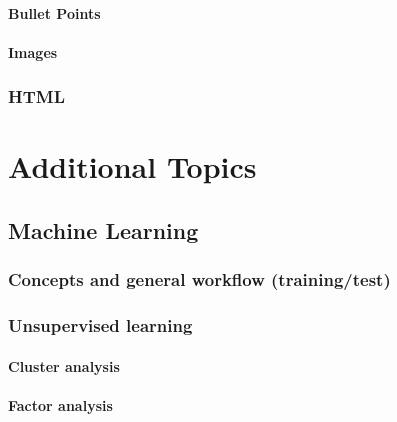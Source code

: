 \documentclass[
]{book}
\begin{document}
\hypertarget{bullet-points}{%
\subsection{Bullet Points}\label{bullet-points}}

\hypertarget{images}{%
\subsection{Images}\label{images}}

\hypertarget{html}{%
\section{HTML}\label{html}}

\hypertarget{part-additional-topics}{%
\part*{Additional Topics}\label{part-additional-topics}}

\hypertarget{machine_learning}{%
\chapter{Machine Learning}\label{machine_learning}}

\hypertarget{concepts-and-general-workflow-trainingtest}{%
\section{Concepts and general workflow (training/test)}\label{concepts-and-general-workflow-trainingtest}}

\hypertarget{unsupervised-learning}{%
\section{Unsupervised learning}\label{unsupervised-learning}}

\hypertarget{cluster-analysis}{%
\subsection{Cluster analysis}\label{cluster-analysis}}

\hypertarget{factor-analysis}{%
\subsection{Factor analysis}\label{factor-analysis}}
\end{document}
